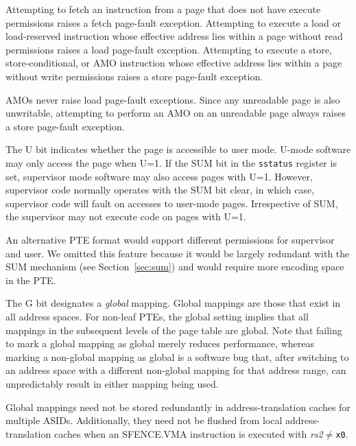 Attempting to fetch an instruction from a page that does not have execute
permissions raises a fetch page-fault exception.  Attempting to execute
a load or load-reserved instruction whose effective address lies within
a page without read permissions raises a load page-fault exception.
Attempting to execute a store, store-conditional,
or AMO instruction whose effective address lies within a page without
write permissions raises a store page-fault exception.
\begin{commentary}
AMOs never raise load page-fault exceptions.  Since any unreadable page is
also unwritable, attempting to perform an AMO on an unreadable page always
raises a store page-fault exception.
\end{commentary}

The U bit indicates whether the page is accessible to user mode.
U-mode software may only access the page when U=1.  If the SUM bit
in the {\tt sstatus} register is
set, supervisor mode software may also access pages with U=1.
However, supervisor code normally operates with the SUM bit clear, in
which case, supervisor code will fault on accesses to user-mode pages.
Irrespective of SUM, the supervisor may not execute code on pages with U=1.

\begin{commentary}
An alternative PTE format would support different permissions for supervisor
and user.  We omitted this feature because it would be largely redundant with
the SUM mechanism (see Section~\ref{sec:sum}) and would require more encoding
space in the PTE.
\end{commentary}

The G bit designates a {\em global} mapping.  Global mappings are those that
exist in all address spaces.  For non-leaf PTEs, the global setting implies
that all mappings in the subsequent levels of the page table are global.  Note
that failing to mark a global mapping as global merely reduces performance,
whereas marking a non-global mapping as global is a software bug that,
after switching to an address space with a different non-global mapping for
that address range, can unpredictably result in either mapping being used.

\begin{commentary}
Global mappings need not be stored redundantly in address-translation caches
for multiple ASIDs.  Additionally, they need not be flushed from local
address-translation caches when an SFENCE.VMA instruction is executed with
{\em rs2}$\neq${\tt x0}.
\end{commentary}

